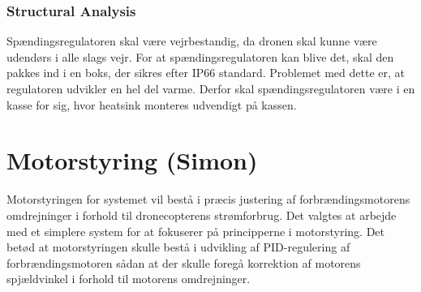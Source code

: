 \subsubsection{Structural Analysis}
\label{sec:generel-analyse-2}

Spændingsregulatoren skal være vejrbestandig, da dronen skal kunne være udendørs i alle slags vejr. For at spændingsregulatoren kan blive det, skal den pakkes ind i en boks, der sikres efter IP66 standard. Problemet med dette er, at regulatoren udvikler en hel del varme. Derfor skal spændingsregulatoren være i en kasse for sig, hvor heatsink monteres udvendigt på kassen.

\section{Motorstyring (Simon)}
\label{sec:motorstyring}

Motorstyringen for systemet vil bestå i præcis justering af forbrændingsmotorens omdrejninger i forhold til dronecopterens strømforbrug. Det valgtes at arbejde med et simplere system for at fokuserer på principperne i motorstyring. Det betød at motorstyringen skulle bestå i udvikling af PID-regulering af forbrændingsmotoren sådan at der skulle foregå korrektion af motorens spjældvinkel i forhold til motorens omdrejninger.





